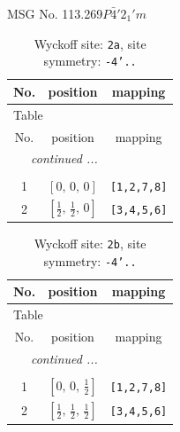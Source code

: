 \documentclass[fleqn,8pt]{jsarticle}
\begin{document}
\setcounter{MaxMatrixCols}{32}

\renewcommand{\tablename}{Table~}
\renewcommand{\figurename}{Figure~}
\begin{center}
\LARGE
MSG No. 113.269\quad$P\bar{4}'2_{1}'m$
\end{center}
\renewcommand{\arraystretch}{1.2}
\begin{longtable}{ccc}
\caption{Wyckoff site: {\tt 2a}, site symmetry: {\tt -4'..}}
 \\
 \hline \hline
No. & position & mapping \\ \hline \endfirsthead

\multicolumn{2}{l}{\tablename\ \thetable{}} \\
 \hline \hline
No. & position & mapping \\ \hline \endhead

 \hline \hline
\multicolumn{2}{r}{\footnotesize\it continued ...} \\ \endfoot

 \hline \hline
\multicolumn{2}{r}{} \\ \endlastfoot

1 & $\left[ 0,\, 0,\, 0 \right]$ & {\tt [1,2,7,8]} \\ \hline
2 & $\left[ \frac{1}{2},\, \frac{1}{2},\, 0 \right]$ & {\tt [3,4,5,6]} \\
\end{longtable}
\renewcommand{\arraystretch}{1.2}
\begin{longtable}{ccc}
\caption{Wyckoff site: {\tt 2b}, site symmetry: {\tt -4'..}}
 \\
 \hline \hline
No. & position & mapping \\ \hline \endfirsthead

\multicolumn{2}{l}{\tablename\ \thetable{}} \\
 \hline \hline
No. & position & mapping \\ \hline \endhead

 \hline \hline
\multicolumn{2}{r}{\footnotesize\it continued ...} \\ \endfoot

 \hline \hline
\multicolumn{2}{r}{} \\ \endlastfoot

1 & $\left[ 0,\, 0,\, \frac{1}{2} \right]$ & {\tt [1,2,7,8]} \\ \hline
2 & $\left[ \frac{1}{2},\, \frac{1}{2},\, \frac{1}{2} \right]$ & {\tt [3,4,5,6]} \\
\end{longtable}
\end{document}
